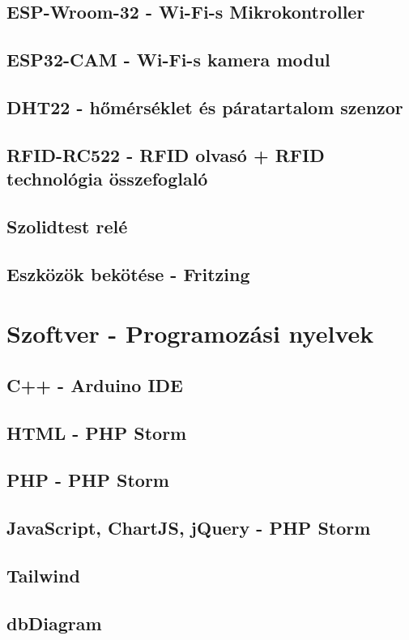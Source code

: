 \documentclass[
]{thesis-ekf}
\theoremstyle{definition}
\theoremstyle{remark}
\begin{document}
	
	\subsection{ESP-Wroom-32 - Wi-Fi-s Mikrokontroller}
	\subsection{ESP32-CAM - Wi-Fi-s kamera modul}
	\subsection{DHT22 - hőmérséklet és páratartalom szenzor}
	\subsection{RFID-RC522 - RFID olvasó + RFID technológia összefoglaló}
	\subsection{Szolidtest relé}
	\subsection{Eszközök bekötése - Fritzing}
	\section{Szoftver - Programozási nyelvek}
	\subsection{C++ - Arduino IDE}
	\subsection{HTML - PHP Storm}
	\subsection{PHP - PHP Storm}
	\subsection{JavaScript, ChartJS, jQuery - PHP Storm}
	\subsection{Tailwind}
	\subsection{dbDiagram}
\end{document}
